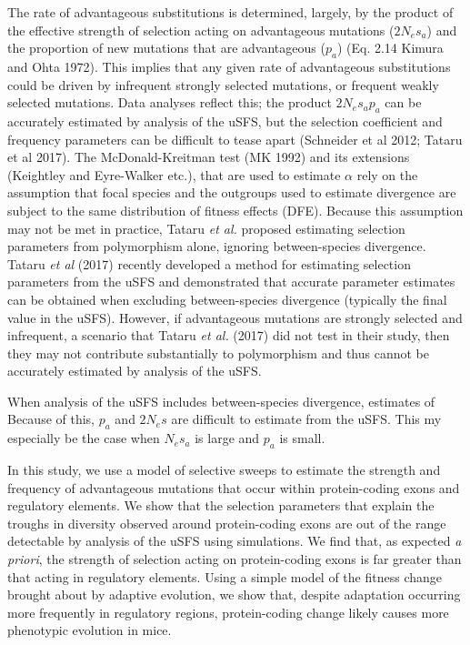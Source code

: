 \documentclass[11pt]{article}
\begin{document}
The rate of advantageous substitutions is determined, largely, by the product of the effective strength of selection acting on advantageous mutations ($2N_es_a$) and the proportion of new mutations that are advantageous ($p_a$) (Eq. 2.14 Kimura and Ohta 1972). This implies that any given rate of advantageous substitutions could be driven by infrequent strongly selected mutations, or frequent weakly selected mutations. Data analyses reflect this; the product $2N_es_ap_a$ can be accurately estimated by analysis of the uSFS, but the selection coefficient and frequency parameters can be difficult to tease apart (Schneider et al 2012; Tataru et al 2017). The McDonald-Kreitman test (MK 1992) and its extensions (Keightley and Eyre-Walker etc.), that are used to estimate $\alpha$ rely on the assumption that focal species and the outgroups used to estimate divergence are subject to the same distribution of fitness effects (DFE). Because this assumption may not be met in practice, Tataru \textit{et al.} proposed estimating selection parameters from polymorphism alone, ignoring between-species divergence. 
Tataru \textit{et al} (2017) recently developed a method for estimating selection parameters from the uSFS and demonstrated that accurate parameter estimates can be obtained when excluding between-species divergence (typically the final value in the uSFS). 
However, if advantageous mutations are strongly selected and infrequent, a scenario that Tataru \textit{et al.} (2017) did not test in their study, then they may not contribute substantially to polymorphism and thus cannot be accurately estimated by analysis of the uSFS.

When analysis of the uSFS includes between-species divergence, estimates of 
 Because of this, $p_a$ and $2N_es$ are difficult to estimate from the uSFS. This my especially be the case when $N_es_a$ is large and $p_a$ is small.

In this study, we use a model of selective sweeps to estimate the strength and frequency of advantageous mutations that occur within protein-coding exons and regulatory elements. We show that the selection parameters that explain the troughs in diversity observed around protein-coding exons are out of the range detectable by analysis of the uSFS using simulations.  We find that, as expected \textit{a priori}, the strength of selection acting on protein-coding exons is far greater than that acting in regulatory elements. Using a simple model of the fitness change brought about by adaptive evolution, we show that, despite adaptation occurring more frequently in regulatory regions, protein-coding change likely causes more phenotypic evolution in mice.
\end{document}
